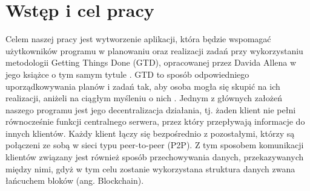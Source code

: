 \chapter{Wstęp i cel pracy}
\label{chap:wstep}

Celem naszej pracy jest wytworzenie aplikacji, która będzie wspomagać użytkowników programu w planowaniu oraz realizacji zadań przy wykorzystaniu metodologii Getting Things Done (GTD), opracowanej przez Davida Allena w jego książce o tym samym tytule \cite{GTD}. GTD to sposób odpowiedniego uporządkowywania planów i zadań tak, aby osoba mogła się skupić na ich realizacji, aniżeli na ciągłym myśleniu o nich \cite{DAllInt}. Jednym z głównych założeń naszego programu jest jego decentralizacja działania, tj. żaden klient nie pełni równocześnie funkcji centralnego serwera, przez który przepływają informacje do innych klientów. Każdy klient łączy się bezpośrednio z pozostałymi, którzy są połączeni ze sobą w sieci typu peer-to-peer (P2P). Z tym sposobem komunikacji klientów związany jest również sposób przechowywania danych, przekazywanych między nimi, gdyż w tym celu zostanie wykorzystana struktura danych zwana łańcuchem bloków (ang. Blockchain).

